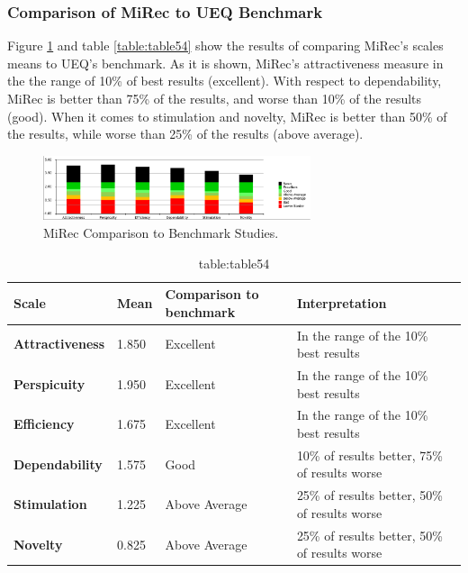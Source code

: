 \subsubsection{Comparison of MiRec to UEQ Benchmark}
Figure \ref{fig:figure57} and table \ref{table:table54} show the results of
comparing MiRec's scales means to UEQ's benchmark. As it is shown, MiRec's
attractiveness measure in the the range of 10\% of best results (excellent).
With respect to dependability, MiRec is better than 75\% of the results, and
worse than 10\% of the results (good). When it comes to stimulation and novelty,
MiRec is better than 50\% of the results, while worse than 25\% of the results
(above average). 
\begin{figure}[!htbp]
\centering
\includegraphics[width=0.7\textwidth]{figures/mirec-benchmark}
\caption{MiRec Comparison to Benchmark Studies.}
\label{fig:figure57}
\end{figure}
\begin{table}[!htbp]
\tiny
\centering
\begin{tabular}{|l|l|l|l|}
\hline
\textbf{Scale}          & \textbf{Mean} & \textbf{Comparison to benchmark} & \textbf{Interpretation}                       \\ \hline
\textbf{Attractiveness} & 1.850         & Excellent                         & In the range of the 10\% best results         \\ \hline
\textbf{Perspicuity}    & 1.950         & Excellent                         & In the range of the 10\% best results         \\ \hline
\textbf{Efficiency}     & 1.675         & Excellent                         & In the range of the 10\% best results         \\ \hline
\textbf{Dependability}  & 1.575         & Good                              & 10\% of results better, 75\% of results worse \\ \hline
\textbf{Stimulation}    & 1.225         & Above Average                     & 25\% of results better, 50\% of results worse \\ \hline
\textbf{Novelty}        & 0.825         & Above Average                     & 25\% of results better, 50\% of results worse \\ \hline
\end{tabular}
\caption{table:table54}
\label{Comparison of MiRec to UEQ Benchmark}
\end{table}

